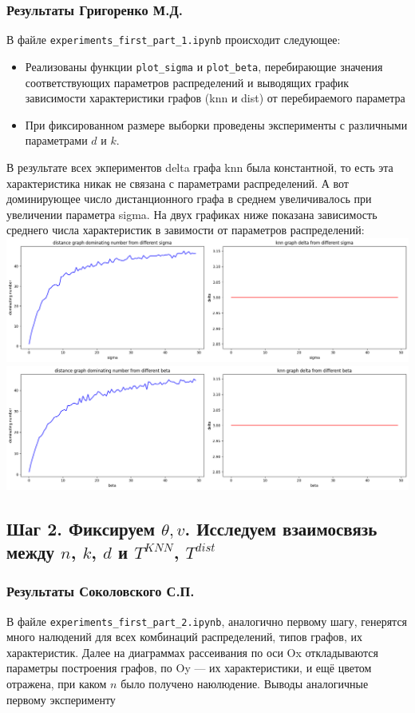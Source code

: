 \documentclass[a4paper,12pt]{article}
\begin{document}
\subsubsection*{Результаты Григоренко М.Д.}
В файле \texttt{experiments\_first\_part\_1.ipynb} происходит следующее:
\begin{itemize}
    \item Реализованы функции \texttt{plot\_sigma} и \texttt{plot\_beta}, перебирающие значения соответствующих параметров распределений и выводящих график зависимости характеристики графов (knn и dist) от перебираемого параметра
    \item При фиксированном размере выборки проведены эксперименты с различными параметрами $d$ и $k$.
\end{itemize}
В результате всех экпериментов delta графа knn была константной, то есть
эта характеристика никак не связана с параметрами распределений. А вот доминирующее число дистанционного графа в среднем увеличивалось при увеличении параметра sigma. На двух графиках ниже показана зависимость среднего числа характеристик в завимости от параметров распределений: \newline
\includegraphics[width=\textwidth]{images/sigma_plot.png}  \newline
\includegraphics[width=\textwidth]{images/beta_plot.png} \newline

\subsection{Шаг 2. Фиксируем $\theta, v$. Исследуем взаимосвязь между $n$, $k$, $d$ и $T^{KNN}$, $T^{dist}$}
\subsubsection*{Результаты Соколовского С.П.}
В файле \texttt{experiments\_first\_part\_2.ipynb}, аналогично первому шагу, генерятся много налюдений для всех комбинаций распределений, типов графов, их характеристик. Далее на диаграммах рассеивания по оси Ox откладываются параметры построения графов, по Oy --- их характеристики, и ещё цветом отражена, при каком $n$ было получено наюлюдение. Выводы аналогичные первому эксперименту
\end{document}

